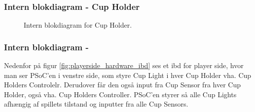 \documentclass[Arkitektur/System_main.tex]{subfiles}
\begin{document}
\subsubsection{Intern blokdiagram - Cup Holder} \label{sec:cup_holder_hardware_ibd}
\begin{figure}[H]
    \centering
    \caption{Intern blokdiagram for Cup Holder.}
    \label{fig:cup_holder_hardware_ibd}
\end{figure}

\subsubsection{Intern blokdiagram - } \label{sec:playerside_hardware_ibd}

Nedenfor på figur \ref{fig:playerside_hardware_ibd} ses et ibd for player side, hvor man ser PSoC'en i venstre side, som styre Cup Light i hver Cup Holder vha. Cup Holders Controlelr. Derudover får den også input fra Cup Sensor fra hver Cup Holder, også vha. Cup Holders Controller. PSoC'en styrer så alle Cup Lights afhængig af spillets tilstand og inputter fra alle Cup Sensors. 
\end{document}
